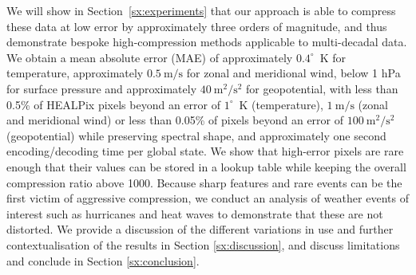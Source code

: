 \documentclass[11pt, a4paper, logo, copyright, numbering]{googledeepmind}
\begin{document}
We will show in Section~\ref{sx:experiments} that our approach is able to compress these data at low error by approximately three orders of magnitude, and thus demonstrate bespoke high-compression methods applicable to multi-decadal data.
We obtain a mean absolute error (MAE) of approximately $0.4^\circ$~K for temperature, approximately $0.5~\text{m}/\text{s}$ for zonal and meridional wind, below 1 hPa for surface pressure and approximately $40~\text{m}^2/\text{s}^2$ for geopotential, with less than 0.5\% of HEALPix pixels beyond an error of $1^\circ$~K (temperature), $1~\text{m}/\text{s}$ (zonal and meridional wind) or less than 0.05\% of pixels beyond an error of $100~\text{m}^2/\text{s}^2$ (geopotential) while preserving spectral shape, and approximately one second encoding/decoding time per global state. 
We show that high-error pixels are rare enough that their values can be stored in a lookup table while keeping the overall compression ratio above 1000.
Because sharp features and rare events can be the first victim of aggressive compression, we conduct an analysis of weather events of interest such as hurricanes and heat waves to demonstrate that these are not distorted.
We provide a discussion of the different variations in use and further contextualisation of the results in Section \ref{sx:discussion}, and discuss limitations and conclude in Section \ref{sx:conclusion}.
\end{document}
